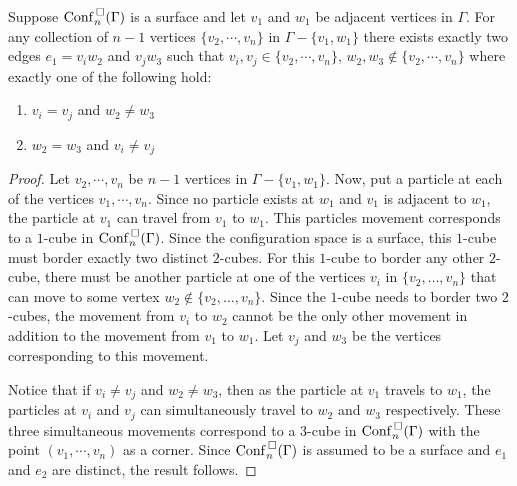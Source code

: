 \begin{lem}
    \label{lem:is_surface_1}
    Suppose \(\mathrm{Conf}^{\,\square}_n(\Gamma)\) is a surface and let \(v_1\) and \(w_1\) be adjacent vertices in \(\Gamma\).
    For any collection of \(n-1\) vertices \(\{v_2, \cdots, v_n\}\) in \(\Gamma - \{v_1, w_1\}\) there exists exactly two edges \(e_1 = v_i w_2\) and \(v_j w_3\)
    such that \(v_i, v_j \in \{v_2, \cdots, v_n\}\), \(w_2, w_3 \not \in \{v_2, \cdots, v_n\}\) where exactly one of the following hold:
    \begin{enumerate}
        \item \(v_i = v_j\) and \(w_2 \neq w_3\)
        \item \(w_2 = w_3\) and \(v_i \neq v_j\)
    \end{enumerate}
\end{lem}
\begin{proof}
    Let \(v_2, \cdots, v_n\) be \(n-1\) vertices in \(\Gamma - \{v_1, w_1\}\).   
    Now, put a particle at each of the vertices \(v_1, \cdots, v_n\).
    Since no particle exists at \(w_1\) and \(v_1\) is adjacent to \(w_1\), 
    the particle at \(v_1\) can travel from \(v_1\) to \(w_1\).
    This particles movement corresponds to a \(1\)-cube in \(\mathrm{Conf}^{\,\square}_n(\Gamma)\).
    Since the configuration space is a surface, this \(1\)-cube must border exactly two distinct \(2\)-cubes.
    For this \(1\)-cube to border any other \(2\)-cube,
    there must be another particle at one of the vertices \(v_i\) in \(\{v_2, \ldots, v_n\}\) that can move to some vertex
    \(w_2 \not \in \{v_2, \ldots, v_n\}\).
    Since the \(1\)-cube needs to border two \(2\)-cubes, the movement from \(v_i\) to \(w_2\) cannot be the only other movement in addition to
    the movement from \(v_1\) to \(w_1\). Let \(v_j\) and \(w_3\) be the vertices corresponding to this movement.
    
    Notice that if \(v_i \neq v_j\) and \(w_2 \neq w_3\), then as the particle at \(v_1\) travels to \(w_1\), the particles
    at \(v_i\) and \(v_j\) can simultaneously travel to \(w_2\) and \(w_3\) respectively. These three simultaneous movements correspond
    to a \(3\)-cube in \(\mathrm{Conf}^{\,\square}_n(\Gamma)\) with the point \((v_1, \cdots, v_n)\) as a corner.
    Since \(\mathrm{Conf}^{\,\square}_n(\Gamma)\) is assumed to be a surface and \(e_1\) and \(e_2\) are distinct, 
    the result follows.
\end{proof}


